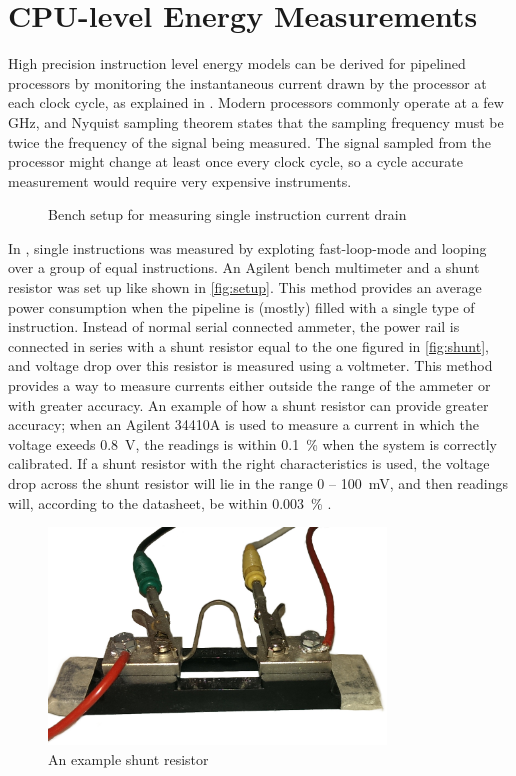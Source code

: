 \section{CPU-level Energy Measurements}
\label{sec:energymeasure}

High precision instruction level energy models can be derived for pipelined
processors by monitoring the instantaneous current drawn by the processor at
each clock cycle, as explained in \cite{nikolaidis2005instruction}. Modern
processors commonly operate at a few GHz, and Nyquist sampling theorem
\cite{nyquist1928certain} states that the sampling frequency must be twice the
frequency of the signal being measured. The signal sampled from the processor
might change at least once every clock cycle, so a cycle accurate measurement
would require very expensive instruments.

\begin{figure}[tbh]
    \centering
    
    \caption{Bench setup for measuring single instruction current drain}
    \label{fig:setup}
\end{figure}

In \cite{rundehvatum2013exploring}, single instructions was measured by
exploting fast-loop-mode and looping over a group of equal instructions. An
Agilent bench multimeter and a shunt resistor was set up like shown in
\autoref{fig:setup}. This method provides an average power consumption when the
pipeline is (mostly) filled with a single type of instruction. Instead of normal
serial connected ammeter, the power rail is connected in series with a shunt
resistor equal to the one figured in \autoref{fig:shunt}, and voltage drop over
this resistor is measured using a voltmeter. This method provides a way to
measure currents either outside the range of the ammeter or with greater
accuracy. An example of how a shunt resistor can provide greater accuracy; when
an Agilent 34410A is used to measure a current in which the voltage exeeds 0.8~V,
the readings is within 0.1~\% when the system is correctly calibrated. If a shunt
resistor with the right characteristics is used, the voltage drop across the
shunt resistor will lie in the range 0 -- 100~mV, and then readings will,
according to the datasheet, be within 0.003~\% \cite{agilent34410a}.

\begin{figure}[tbh]
    \centering
    \includegraphics[width=0.8\textwidth]{figs/shunt.jpg}
    \caption{An example shunt resistor}
    \label{fig:shunt}
\end{figure}


